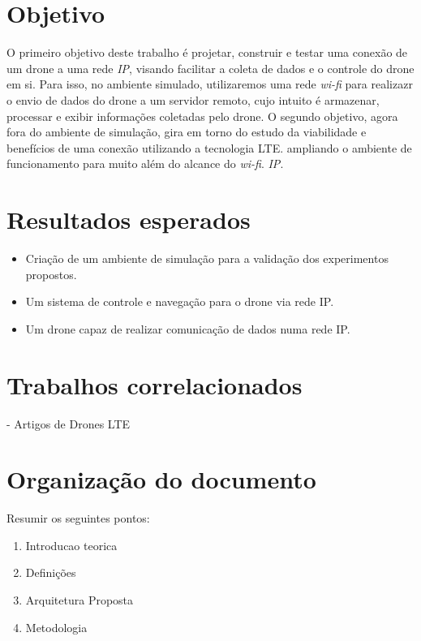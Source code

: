 \documentclass[12pt,a4paper,oneside]{book}
\begin{document}
\section{Objetivo}

O primeiro objetivo deste trabalho é projetar, construir e testar uma conexão de  um drone a uma rede \textit{IP}, visando facilitar a coleta de dados e o controle do drone em si. Para isso, no ambiente simulado, utilizaremos uma rede \textit{wi-fi} para realizazr o envio de dados do drone a um servidor remoto, cujo intuito é armazenar, processar e exibir informações coletadas pelo drone. O segundo objetivo, agora fora do ambiente de simulação, gira em torno do estudo da viabilidade e benefícios 
de uma conexão utilizando a tecnologia LTE. ampliando o ambiente de funcionamento para muito além do alcance do \textit{wi-fi}.
\textit{IP}.  

\section{Resultados esperados}

\begin{itemize}
\item Criação de um ambiente de simulação para a validação dos experimentos propostos.
\item Um sistema de controle e navegação para o drone via rede IP.
\item Um drone capaz de realizar comunicação de dados numa rede IP.    
\end{itemize}

\section{Trabalhos correlacionados}

 - Artigos de Drones LTE
 \cite{artigo_relacionado_1}

\section{Organização do documento}
Resumir os seguintes pontos:
\begin{enumerate}
    \item Introducao teorica
    \item Definições
    \item Arquitetura Proposta
    \item Metodologia
\end{enumerate}
\end{document}
